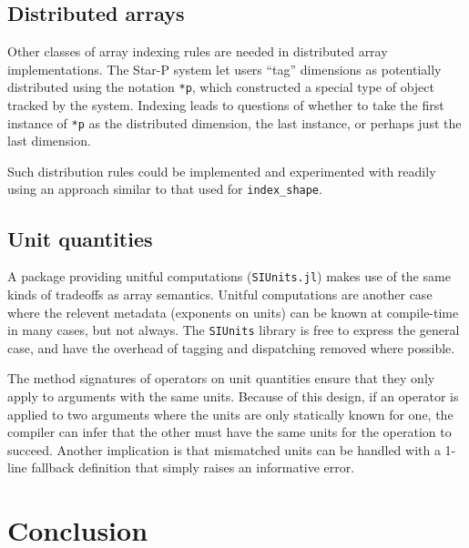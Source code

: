 \documentclass[preprint]{sigplanconf}
\newcommand{\code}[1]{\texttt{#1}}
\begin{document}
\subsection{Distributed arrays}

Other classes of array indexing rules are needed in distributed array
implementations. The Star-P system \cite{parry, Choy05parallelmatlab}
let users ``tag'' dimensions as potentially distributed using the notation
\code{*p}, which constructed a special type of object tracked by the system.
Indexing leads to questions of whether to take the first instance of \code{*p}
as the distributed dimension, the last instance, or perhaps just the last dimension.

Such distribution rules could be implemented and experimented with readily
using an approach similar to that used for \code{index\_shape}.



\subsection{Unit quantities}

A package providing unitful computations (\code{SIUnits.jl}\cite{Fischer:2014si})
makes use of the same kinds of
tradeoffs as array semantics. Unitful computations are another case
where the relevent metadata (exponents on units) can be
known at compile-time in many cases, but not always. The
\code{SIUnits} library is free to express the general case, and have the
overhead of tagging and dispatching removed where possible.

The method signatures of operators on unit quantities ensure that they only
apply to arguments with the same units. Because of this design, if an
operator is applied to two arguments where the units are only statically
known for one, the compiler can infer that the other must have the same units
for the operation to succeed. Another implication is that mismatched units can
be handled with a 1-line fallback definition that simply raises an
informative error.


\section{Conclusion}
\end{document}
